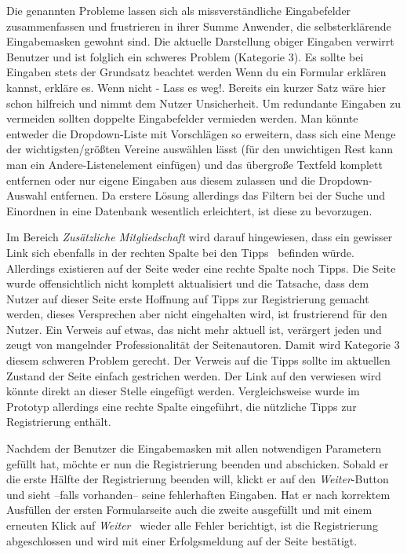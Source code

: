 { Die genannten Probleme lassen sich als missverständliche Eingabefelder zusammenfassen und frustrieren in ihrer Summe Anwender, die selbsterklärende Eingabemasken gewohnt sind. Die aktuelle Darstellung obiger Eingaben verwirrt Benutzer und ist folglich ein schweres Problem (Kategorie 3).
}{
Es sollte bei Eingaben stets der Grundsatz beachtet werden \glqq Wenn du ein Formular erklären kannst, erkläre es. Wenn nicht - Lass es weg!\grqq. Bereits ein kurzer Satz wäre hier schon hilfreich und nimmt dem Nutzer Unsicherheit. Um redundante Eingaben zu vermeiden sollten doppelte Eingabefelder vermieden werden. Man könnte entweder die Dropdown-Liste mit Vorschlägen so erweitern, dass sich eine Menge der wichtigsten/größten Vereine auswählen lässt (für den unwichtigen Rest kann man ein \glqq Andere\grqq-Listenelement einfügen) und das übergroße Textfeld komplett entfernen oder nur eigene Eingaben aus diesem zulassen und die Dropdown-Auswahl entfernen. Da erstere Lösung allerdings das Filtern bei der Suche und Einordnen in eine Datenbank wesentlich erleichtert, ist diese zu bevorzugen.}
\label{prob:reg:unclearinput}


{ Im Bereich \emph{Zusätzliche Mitgliedschaft} wird darauf hingewiesen, dass ein gewisser Link sich ebenfalls in der \glqq rechten Spalte bei den Tipps\grqq ~ befinden würde. Allerdings existieren auf der Seite weder eine rechte Spalte noch Tipps. Die Seite wurde offensichtlich nicht komplett aktualisiert und die Tatsache, dass dem Nutzer auf dieser Seite erste Hoffnung auf Tipps zur Registrierung gemacht werden, dieses Versprechen aber nicht eingehalten wird, ist frustrierend für den Nutzer.
}
{ Ein Verweis auf etwas, das nicht mehr aktuell ist, verärgert jeden und zeugt von mangelnder Professionalität der Seitenautoren. Damit wird Kategorie 3 diesem schweren Problem gerecht.
}
{ Der Verweis auf die Tipps sollte im aktuellen Zustand der Seite einfach gestrichen werden. Der Link auf den verwiesen wird könnte direkt an dieser Stelle eingefügt werden. Vergleichsweise wurde im Prototyp allerdings eine rechte Spalte eingeführt, die nützliche Tipps zur Registrierung enthält.
} 
\label{prob:reg:missingtipps}


Nachdem der Benutzer die Eingabemasken mit allen notwendigen Parametern gefüllt hat, möchte er nun die Registrierung beenden und abschicken. Sobald
er die erste Hälfte der Registrierung beenden will, klickt er auf den \emph{Weiter}-Button und sieht --falls vorhanden-- seine fehlerhaften Eingaben. Hat er nach korrektem
Ausfüllen der ersten Formularseite auch die zweite ausgefüllt und mit einem erneuten Klick auf \emph{Weiter} ~wieder alle Fehler berichtigt, ist die Registrierung abgeschlossen und wird mit einer Erfolgsmeldung auf der Seite bestätigt.


